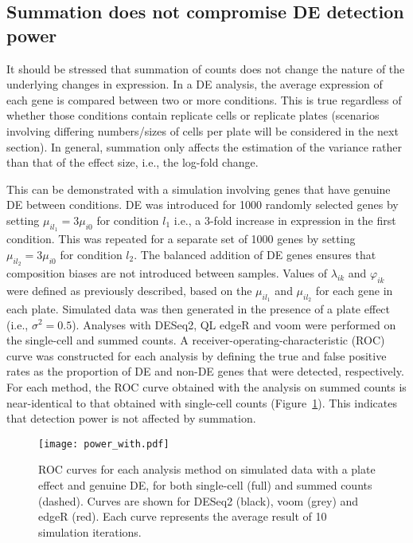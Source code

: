 \documentclass{article}
\begin{document}
\subsection{Summation does not compromise DE detection power}
It should be stressed that summation of counts does not change the nature of the underlying changes in expression.
In a DE analysis, the average expression of each gene is compared between two or more conditions.
This is true regardless of whether those conditions contain replicate cells or replicate plates 
    (scenarios involving differing numbers/sizes of cells per plate will be considered in the next section).
In general, summation only affects the estimation of the variance rather than that of the effect size, i.e., the log-fold change.

This can be demonstrated with a simulation involving genes that have genuine DE between conditions.
DE was introduced for 1000 randomly selected genes by setting $\mu_{il_1} = 3\mu_{i0}$ for condition $l_1$ i.e., a 3-fold increase in expression in the first condition.
This was repeated for a separate set of 1000 genes by setting $\mu_{il_2} = 3\mu_{i0}$ for condition $l_2$.
The balanced addition of DE genes ensures that composition biases \cite{robinson2010scaling} are not introduced between samples.
Values of $\lambda_{ik}$ and $\varphi_{ik}$ were defined as previously described, based on the $\mu_{il_1}$ and $\mu_{il_2}$ for each gene in each plate.
Simulated data was then generated in the presence of a plate effect (i.e., $\sigma^2=0.5$).
Analyses with DESeq2, QL edgeR and voom were performed on the single-cell and summed counts.
A receiver-operating-characteristic (ROC) curve was constructed for each analysis by defining the true and false positive rates as the proportion of DE and non-DE genes that were detected, respectively.
For each method, the ROC curve obtained with the analysis on summed counts is near-identical to that obtained with single-cell counts (Figure~\ref{fig:roc}).
This indicates that detection power is not affected by summation.

\begin{figure}[tbp]
\begin{center}
\texttt{[image: power\_with.pdf]}
\end{center}
\caption{
    ROC curves for each analysis method on simulated data with a plate effect and genuine DE, for both single-cell (full) and summed counts (dashed).
    Curves are shown for DESeq2 (black), voom (grey) and edgeR (red).
    Each curve represents the average result of 10 simulation iterations.
}
\label{fig:roc}
\end{figure}
\end{document}
